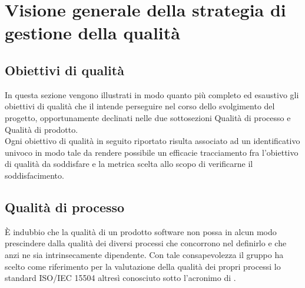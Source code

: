 \section{Visione generale della strategia di gestione della qualità}
	\subsection{Obiettivi di qualità}
	In questa sezione vengono illustrati in modo quanto più completo ed esaustivo gli obiettivi di qualità che il  intende perseguire nel corso dello svolgimento del progetto, opportunamente declinati nelle due sottosezioni Qualità di processo e Qualità di prodotto.
\\Ogni obiettivo di qualità in seguito riportato risulta associato ad un identificativo univoco in modo tale da rendere possibile un efficacie tracciamento fra l'obiettivo di qualità da soddisfare e la metrica scelta allo scopo di verificarne il soddisfacimento.

	\subsection{Qualità di processo}
	È indubbio che la qualità di un prodotto software non possa in alcun modo prescindere dalla qualità dei diversi processi che concorrono nel definirlo e che anzi ne sia intrinsecamente dipendente. Con tale consapevolezza il gruppo ha scelto come riferimento per la valutazione della qualità dei propri processi lo standard ISO/IEC 15504 altresì conosciuto sotto l'acronimo di .
